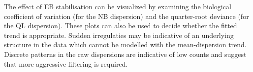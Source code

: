\documentclass{report}\usepackage[]{graphicx}\usepackage[usenames,dvipsnames]{color}
\newcommand{\hlnum}[1]{\textcolor[rgb]{0.816,0.125,0.439}{#1}}%
\newcommand{\hlopt}[1]{\textcolor[rgb]{0,0,0}{#1}}%
\newcommand{\hlstd}[1]{\textcolor[rgb]{0.251,0.251,0.251}{#1}}%
\newcommand{\hlkwb}[1]{\textcolor[rgb]{0,0,0}{#1}}%
\newcommand{\hlkwc}[1]{\textcolor[rgb]{0.251,0.251,0.251}{#1}}%
\newcommand{\hlkwd}[1]{\textcolor[rgb]{0.878,0.439,0.125}{#1}}%
\newenvironment{knitrout}{}{} %
\begin{document}
\begin{knitrout}
\color{fgcolor}
\end{knitrout}

The effect of EB stabilisation can be visualized by examining the biological coefficient of variation (for the NB dispersion) and the quarter-root deviance (for the QL dispersion). 
These plots can also be used to decide whether the fitted trend is appropriate. 
Sudden irregulaties may be indicative of an underlying structure in the data which cannot be modelled with the mean-dispersion trend. 
Discrete patterns in the raw dispersions are indicative of low counts and suggest that more aggressive filtering is required.
\end{document}
